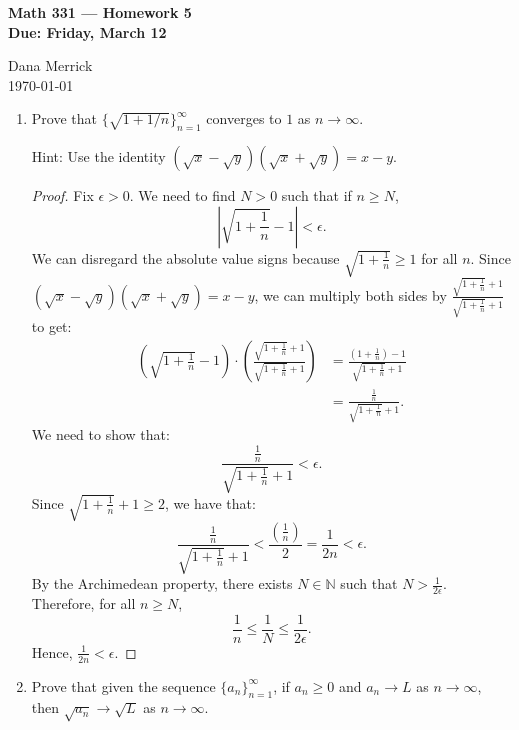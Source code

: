 \documentclass[12pt]{amsart}
\begin{document}
\thispagestyle{empty}

\begin{center}
{\bf Math 331  --- Homework 5 \\
Due:  Friday, March 12}
\end{center}

\bigskip

\noindent
Dana Merrick \\
\today

\bigskip

\begin{enumerate}

\setlength{\itemsep}{6pt}

\addtocounter{enumi}{1}

\item Prove that $\{\sqrt{1+1/n} \}_{n=1}^\infty$ converges to $1$ as $n\rightarrow \infty$. 

Hint:  Use the identity $(\sqrt{x}-\sqrt{y})(\sqrt{x}+\sqrt{y})=x-y$.
  
\begin{proof}
Fix $\epsilon>0$. We need to find $N>0$ such that if $n\ge N$,
\[ \left| \sqrt{1+\frac 1 n} - 1\right| < \epsilon.\]
We can disregard the absolute value signs because $\sqrt{1+\frac 1 n} \ge 1$ for all $n$. Since $(\sqrt{x}-\sqrt{y})(\sqrt{x}+\sqrt{y})=x-y$, we can multiply both sides by $\frac {\sqrt{1+\frac 1 n} + 1}{\sqrt{1+\frac 1 n} + 1}$ to get:
\begin{align*}
\left(\sqrt{1+\frac 1 n} - 1\right)\cdot \left(\frac {\sqrt{1+\frac 1 n} + 1}{\sqrt{1+\frac 1 n} + 1} \right) &= \frac {(1+\frac 1 n) - 1}{\sqrt{1+\frac 1 n} + 1} \\
&= \frac {\frac 1 n}{\sqrt{1+\frac 1 n} + 1}.
\end{align*}
We need to show that: 
\[ \frac {\frac 1 n}{\sqrt{1+\frac 1 n} + 1} < \epsilon. \]
Since $\sqrt{1+\frac 1 n} + 1 \ge  2$, we have that:
\[\frac {\frac 1 n}{\sqrt{1+\frac 1 n} + 1} < \frac {\left(\frac 1 n\right)}{2} = \frac 1 {2n} < \epsilon.
\]
By the Archimedean property, there exists $N\in\mathbb N$ such that $N > \frac 1 {2\epsilon}$. Therefore, for all $n\ge N$,
\[ 
\frac 1 n \le \frac 1 N \le \frac 1 {2\epsilon}.
\]
Hence, $\frac 1 {2n} < \epsilon$.
\end{proof}

\item Prove that given the sequence $\{a_n\}_{n=1}^\infty$, if
  $a_n\geq 0$ and $a_n\rightarrow L$ as $n\rightarrow \infty$, then
  $\sqrt{a_n}\rightarrow \sqrt{L}$ as $n\rightarrow \infty$. 
  

\end{enumerate}
\end{document}
